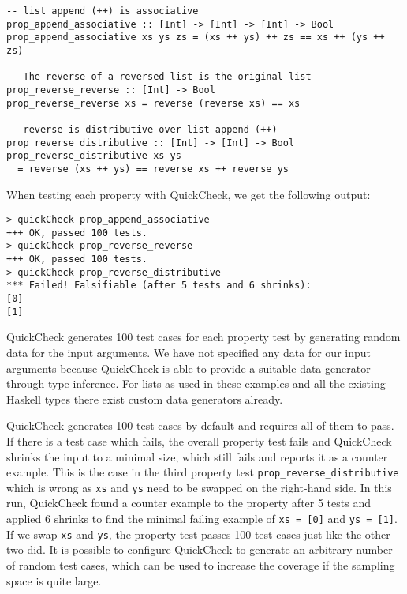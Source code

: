 \begin{footnotesize}
\begin{verbatim}
-- list append (++) is associative
prop_append_associative :: [Int] -> [Int] -> [Int] -> Bool
prop_append_associative xs ys zs = (xs ++ ys) ++ zs == xs ++ (ys ++ zs)

-- The reverse of a reversed list is the original list
prop_reverse_reverse :: [Int] -> Bool
prop_reverse_reverse xs = reverse (reverse xs) == xs

-- reverse is distributive over list append (++)
prop_reverse_distributive :: [Int] -> [Int] -> Bool
prop_reverse_distributive xs ys 
  = reverse (xs ++ ys) == reverse xs ++ reverse ys
\end{verbatim}
\end{footnotesize}

When testing each property with QuickCheck, we get the following output:

\begin{footnotesize}
\begin{verbatim}
> quickCheck prop_append_associative
+++ OK, passed 100 tests.
> quickCheck prop_reverse_reverse
+++ OK, passed 100 tests.
> quickCheck prop_reverse_distributive
*** Failed! Falsifiable (after 5 tests and 6 shrinks):    
[0]
[1]
\end{verbatim}
\end{footnotesize}

QuickCheck generates 100 test cases for each property test by generating random data for the input arguments. We have not specified any data for our input arguments because QuickCheck is able to provide a suitable data generator through type inference. For lists as used in these examples and all the existing Haskell types there exist custom data generators already. %

QuickCheck generates 100 test cases by default and requires all of them to pass. If there is a test case which fails, the overall property test fails and QuickCheck shrinks the input to a minimal size, which still fails and reports it as a counter example. This is the case in the third property test \texttt{prop\_reverse\_distributive} which is wrong as \texttt{xs} and \texttt{ys} need to be swapped on the right-hand side. In this run, QuickCheck found a counter example to the property after 5 tests and applied 6 shrinks to find the minimal failing example of \texttt{xs = [0]} and \texttt{ys = [1]}. If we swap \texttt{xs} and \texttt{ys}, the property test passes 100 test cases just like the other two did. It is possible to configure QuickCheck to generate an arbitrary number of random test cases, which can be used to increase the coverage if the sampling space is quite large.